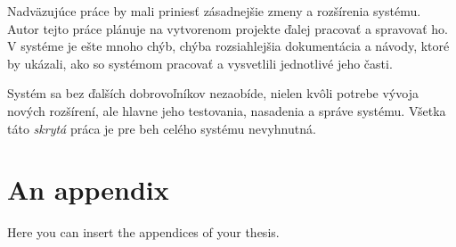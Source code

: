 \documentclass[
  digital, %
  twoside, %
  table,   %
  lof,     %
  lot,     %
]{fithesis3}
\begin{document}
Nadväzujúce práce by mali priniesť zásadnejšie zmeny a rozšírenia systému. Autor tejto práce plánuje na vytvorenom projekte ďalej pracovať a spravovať ho. V systéme je ešte mnoho chýb, chýba rozsiahlejšia dokumentácia a návody, ktoré by ukázali, ako so systémom pracovať a vysvetlili jednotlivé jeho časti.

Systém sa bez ďalších dobrovoľníkov nezaobíde, nielen kvôli potrebe vývoja nových rozšírení, ale hlavne jeho testovania, nasadenia a správe systému. Všetka táto \emph{skrytá} práca je pre beh celého systému nevyhnutná.




\appendix %
\chapter{An appendix}
Here you can insert the appendices of your thesis.
\end{document}
